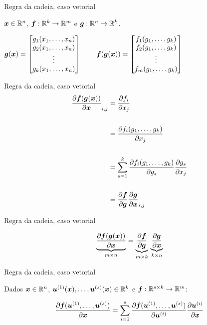 \documentclass[10pt]{beamer}
\begin{document}
\begin{frame}{Regra da cadeia, caso vetorial}
\large{
$\bm{x}\in \mathbb{R}^{n}$, $\bm{f}:\mathbb{R}^{k} \rightarrow \mathbb{R}^{m}$ e $\bm{g}:\mathbb{R}^{n} \rightarrow \mathbb{R}^{k}$.

\vspace{1.0 cm}

$\bm{g}(\bm{x}) = \begin{bmatrix}g_1(x_1, \dots, x_n)\\ g_2(x_1, \dots, x_n)\\ \vdots \\g_k(x_1, \dots, x_n)\end{bmatrix} \;\;\;\;\;\;\;\; \bm{f}(\bm{g}(\bm{x})) = \begin{bmatrix}f_1(g_1, \dots, g_k)\\ f_2(g_1, \dots, g_k)\\ \vdots \\f_m(g_1, \dots, g_k)\end{bmatrix}$
}
\end{frame}


\begin{frame}{Regra da cadeia, caso vetorial}
\large{
\begin{align*}
\frac{\partial \bm{f}(\bm{g}(\bm{x}))}{\partial \bm{x}}_{i,j} &= \frac{\partial f_i}{\partial x_j}\\
&\\
&= \frac{\partial f_i(g_1, \dots, g_k)}{\partial x_j}\\
&\\
&= \sum_{s=1}^{k} \frac{\partial f_i(g_1, \dots, g_k)}{\partial g_s}\frac{\partial g_s}{\partial x_j}\\
&\\
&= \frac{\partial \bm{f}}{\partial \bm{g}} \frac{\partial \bm{g}}{\partial \bm{x}}_{i,j}
\end{align*}
}
\end{frame}


\begin{frame}{Regra da cadeia, caso vetorial}
\Large{

\begin{equation*}
\underbrace{\frac{\partial \bm{f}(\bm{g}(\bm{x}))}{\partial \bm{x}}}_{m \times n}  = \underbrace{\frac{\partial \bm{f}}{\partial \bm{g}}}_{m \times k} \, \underbrace{\frac{\partial \bm{g}}{\partial \bm{x}}}_{k \times n}
\end{equation*}
}
\end{frame}

\begin{frame}{Regra da cadeia, caso vetorial}
\Large{
Dados $\bm{x} \in  \mathbb{R}^{n}$,  $\bm{u}^{(1)}(\bm{x}), \dots, \bm{u}^{(s)}(\bm{x}) \in \mathbb{R}^{k}$ e $\bm{f}:\mathbb{R}^{s \times k} \rightarrow \mathbb{R}^{m}$:

\begin{equation*}
\frac{\partial \bm{f}(\bm{u}^{(1)}, \dots, \bm{u}^{(s)})}{\partial \bm{x}} = \sum_{i=1}^{s} \frac{\partial \bm{f}(\bm{u}^{(1)}, \dots, \bm{u}^{(s)})}{\partial \bm{u}^{(i)}} \frac{\partial \bm{u}^{(i)}}{\partial \bm{x}}
\end{equation*}
}
\end{frame}
\end{document}
